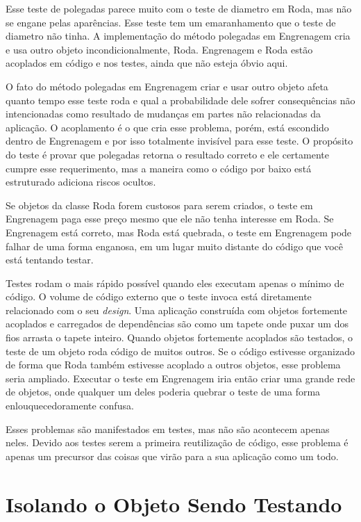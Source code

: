 Esse teste de polegadas parece muito com o teste de diametro em Roda, mas não
se engane pelas aparências. Esse teste tem um emaranhamento que o teste de
diametro não tinha. A implementação do método polegadas em Engrenagem cria e
usa outro objeto incondicionalmente, Roda. Engrenagem e Roda estão acoplados em
código e nos testes, ainda que não esteja óbvio aqui.

O fato do método polegadas em Engrenagem criar e usar outro objeto afeta quanto
tempo esse teste roda e qual a probabilidade dele sofrer consequências
não intencionadas como resultado de mudanças em partes não relacionadas da
aplicação. O acoplamento é o que cria esse problema, porém, está escondido
dentro de Engrenagem e por isso totalmente invisível para esse teste. O propósito
do teste é provar que polegadas retorna o resultado correto e ele certamente cumpre
esse requerimento, mas a maneira como o código por baixo está estruturado adiciona
riscos ocultos.

Se objetos da classe Roda forem custosos para serem criados, o teste em
Engrenagem paga esse preço mesmo que ele não tenha interesse em Roda. Se
Engrenagem está correto, mas Roda está quebrada, o teste em Engrenagem pode
falhar de uma forma enganosa, em um lugar muito distante do código que você
está tentando testar.

Testes rodam o mais rápido possível quando eles executam apenas o mínimo de
código. O volume de código externo que o teste invoca está diretamente
relacionado com o seu \textit{design}. Uma aplicação construída com objetos
fortemente acoplados e carregados de dependências são como um tapete onde puxar
um dos fios arrasta o tapete inteiro. Quando objetos fortemente acoplados são
testados, o teste de um objeto roda código de muitos outros. Se o código estivesse
organizado de forma que Roda também estivesse acoplado a outros objetos, esse
problema seria ampliado. Executar o teste em Engrenagem iria então criar uma
grande rede de objetos, onde qualquer um deles poderia quebrar o teste de uma
forma enlouquecedoramente confusa.

Esses problemas são manifestados em testes, mas não são acontecem apenas neles.
Devido aos testes serem a primeira reutilização de código, esse problema é apenas um
precursor das coisas que virão para a sua aplicação como um todo.

\section{Isolando o Objeto Sendo Testando}

